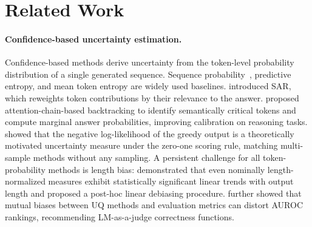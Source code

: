 \section{Related Work}
\label{sec:related}

\paragraph{Confidence-based uncertainty estimation.}
Confidence-based methods derive uncertainty from the token-level probability distribution of a single generated sequence.
Sequence probability~\citep{malinin2021uncertainty}, predictive entropy, and mean token entropy are widely used baselines.
\citet{duan2024shifting} introduced SAR, which reweights token contributions by their relevance to the answer.
\citet{li2025uqac} proposed attention-chain-based backtracking to identify semantically critical tokens and compute marginal answer probabilities, improving calibration on reasoning tasks.
\citet{schweighofer2025rethinking} showed that the negative log-likelihood of the greedy output is a theoretically motivated uncertainty measure under the zero-one scoring rule, matching multi-sample methods without any sampling.
A persistent challenge for all token-probability methods is length bias: \citet{vashurin2025line} demonstrated that even nominally length-normalized measures exhibit statistically significant linear trends with output length and proposed a post-hoc linear debiasing procedure.
\citet{santilli2025lengthbias} further showed that mutual biases between UQ methods and evaluation metrics can distort AUROC rankings, recommending LM-as-a-judge correctness functions.

